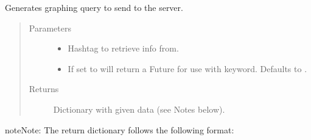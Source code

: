 \documentclass[letterpaper,10pt,english,openany,oneside]{sphinxmanual}
\begin{document}

\begin{fulllineitems}
\label{\detokenize{source/api:instahashtag.api.graph}}
Generates graphing query to send to the server.
\begin{quote}\begin{description}
\item[{Parameters}] \leavevmode\begin{itemize}
\item {} 
 \textendash{} Hashtag to retrieve info from.

\item {} 
 \textendash{} If set to  will return a Future for use with  keyword. Defaults to .

\end{itemize}

\item[{Returns}] \leavevmode
Dictionary with given data (see Notes below).

\end{description}\end{quote}

\begin{sphinxadmonition}{note}{Note:}
The return dictionary follows the following format:

\begin{sphinxVerbatim}[commandchars=\\\{\}]
     \PYG{p}{[}
             
             
             
             
    \PYG{p}{]}
     
     \PYG{p}{[}
         
         
         
         
         
    \PYG{p}{]}
     
     \PYG{p}{[} \PYG{p}{]}
\end{sphinxVerbatim}
\end{sphinxadmonition}

\end{fulllineitems}
\end{document}
